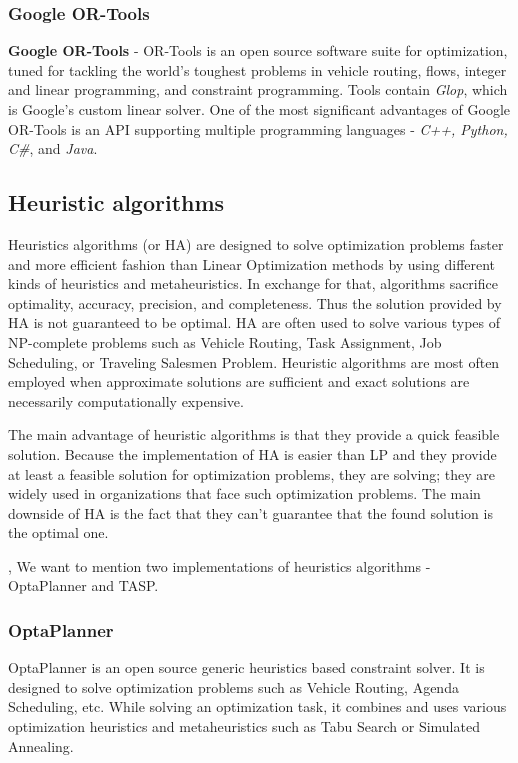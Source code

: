 \subsubsection{Google OR-Tools}
\textbf{Google OR-Tools} - OR-Tools is an open source software suite for optimization,
tuned for tackling the world's toughest problems in vehicle routing, flows,
integer and linear programming, and constraint programming\cite{web:googleOrTools}.
Tools contain \textit{Glop}, which is Google's custom linear solver.
One of the most significant advantages of Google OR-Tools is an API supporting multiple programming languages - \textit{C++, Python, C\#}, and \textit{Java}.


\subsection{Heuristic algorithms}\label{subsec:heuristic-algorithms}
Heuristics algorithms (or HA) are designed to solve optimization problems faster
and more efficient fashion than Linear Optimization methods by using different kinds of heuristics and metaheuristics.
In exchange for that, algorithms sacrifice optimality, accuracy, precision, and completeness.
Thus the solution provided by HA is not guaranteed to be optimal.
HA are often used to solve various types of NP-complete problems such as
Vehicle Routing, Task Assignment, Job Scheduling, or Traveling Salesmen Problem.
Heuristic algorithms are most often employed when approximate solutions are sufficient
and exact solutions are necessarily computationally expensive\cite{papanikolaou2018holistic}.

The main advantage of heuristic algorithms is that they provide a quick feasible solution.
Because the implementation of HA is easier than LP and they provide at least a feasible solution for optimization problems,
they are solving; they are widely used in organizations that face such optimization problems.
The main downside of HA is the fact that they can't guarantee that the found solution is the optimal one.

\medskip
\noindent, We want to mention two implementations of heuristics algorithms - OptaPlanner and TASP\@.

\subsubsection{OptaPlanner}\label{subsubsec:heuristic-algs-optaplanner}
OptaPlanner is an open source generic heuristics based constraint solver.
It is designed to solve optimization problems such as Vehicle Routing, Agenda Scheduling, etc.
While solving an optimization task, it combines and uses various optimization heuristics and metaheuristics such as
Tabu Search or Simulated Annealing.

